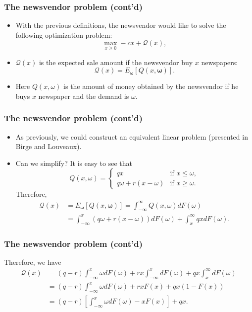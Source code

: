 \documentclass{beamer}
\def\bomega{\boldsymbol\omega}
\begin{document}
\begin{frame}
\frametitle{The newsvendor problem (cont'd)}

\begin{itemize}
\item
With the previous definitions, the newsvendor would like to solve the following optimization problem:
\[
\max_{x \geq 0} -cx + \mathcal{Q}(x),
\]
\item
$\mathcal{Q}(x)$ is the expected sale amount if the newsvendor buy $x$ newspapers:
\[
\mathcal{Q}(x) = E_{\bomega} [ Q(x, \bomega)].
\]
\item
Here $Q(x, \omega)$ is the amount of money obtained by the newsvendor if he buys $x$ newspaper and the demand is $\omega$.
\end{itemize}

\end{frame}

\begin{frame}
\frametitle{The newsvendor problem (cont'd)}

\begin{itemize}
\item
As previously, we could construct an equivalent linear problem (presented in Birge and Louveaux).
\item
Can we simplify? It is easy to see that
\[
Q(x, \omega) =
\begin{cases} 
qx & \mbox{if } x \leq \omega, \\
q\omega + r(x - \omega) & \mbox{if } x \geq \omega.
\end{cases}
\]
Therefore,
\begin{align*}
\mathcal{Q}(x) & = E_{\bomega} [ Q(x, \bomega) ] =
\int_{-\infty}^{\infty} Q(x, \omega) dF(\omega) 
\\ & = \int_{-\infty}^x(q\omega + r(x - \omega))dF(\omega) + \int^{\infty}_x
qxdF(\omega).
\end{align*}
\end{itemize}

\end{frame}

\begin{frame}
\frametitle{The newsvendor problem (cont'd)}

Therefore, we have
\begin{align*}
\mathcal{Q}(x) & = (q-r) \int_{-\infty}^x \omega dF(\omega) + rx
\int_{-\infty}^x dF(\omega) + qx \int_x^{\infty} dF(\omega) \\
& = (q-r) \int_{-\infty}^x \omega dF(\omega) + rx F(x) + qx (1-F(x)) \\
& = (q-r) \left[ \int_{-\infty}^x \omega dF(\omega) - x F(x) \right] + qx. \\
\end{align*}

\end{frame}
\end{document}
